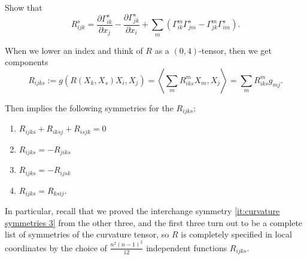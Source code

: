 \begin{exercise}
	Show that
	\[
		R_{ijk}^s = \frac{\partial \Gamma_{ik}^s}{\partial x_j} - \frac{\partial \Gamma_{jk}^s}{\partial x_i} + \sum_m(\Gamma_{ik}^m \Gamma_{jm}^s - \Gamma_{jk}^m \Gamma_{im}^s).
	\]
\end{exercise}

When we lower an index and think of $R$ as a $(0,4)$-tensor, then we get components
\[
	R_{ijks} := g(R(X_k,X_s)X_i,X_j) = \left\langle \sum_{m}R_{iks}^m X_m, X_j \right\rangle = \sum_m R_{iks}^m g_{mj}.
\]

Then  implies the following symmetries for the $R_{ijks}$:

\begin{corollary}\label{cor:symmetries of curvature components}
	\begin{enumerate}
		\item $R_{ijks} + R_{iksj} + R_{isjk} = 0$
		\item $R_{ijks} = -R_{jiks}$
		\item $R_{ijks} = -R_{ijsk}$
		\item $R_{ijks} = R_{ksij}$.
	\end{enumerate}
\end{corollary}

In particular, recall that we proved the interchange symmetry \ref{it:curvature symmetries 3} from the other three, and the first three turn out to be a complete list of symmetries of the curvature tensor, so $R$ is completely specified in local coordinates by the choice of $\frac{n^2(n-1)^2}{12}$ independent functions $R_{ijks}$.